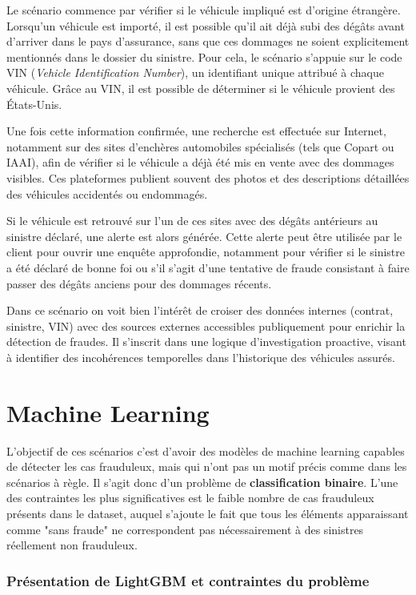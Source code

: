 \documentclass [twoside,openright,a4paper,11pt,french] {report}
\begin{document}
Le scénario commence par vérifier si le véhicule impliqué est d'origine étrangère. 
Lorsqu'un véhicule est importé, il est possible qu'il ait déjà subi des dégâts avant 
d'arriver dans le pays d'assurance, sans que ces dommages ne soient explicitement 
mentionnés dans le dossier du sinistre. Pour cela, le scénario s'appuie sur le code VIN 
(\textit{Vehicle Identification Number}), un identifiant unique attribué à chaque 
véhicule. Grâce au VIN, il est possible de déterminer si le véhicule provient des 
États-Unis.

Une fois cette information confirmée, une recherche est effectuée sur Internet, 
notamment sur des sites d'enchères automobiles spécialisés (tels que Copart ou IAAI), 
afin de vérifier si le véhicule a déjà été mis en vente avec des dommages visibles. 
Ces plateformes publient souvent des photos et des descriptions détaillées des véhicules 
accidentés ou endommagés.

Si le véhicule est retrouvé sur l'un de ces sites avec des dégâts antérieurs au sinistre 
déclaré, une alerte est alors générée. Cette alerte peut être utilisée par le client 
pour ouvrir une enquête approfondie, notamment pour vérifier si le sinistre a été 
déclaré de bonne foi ou s'il s'agit d'une tentative de fraude consistant à faire passer 
des dégâts anciens pour des dommages récents.

Dans ce scénario on voit bien l'intérêt de croiser des données internes (contrat, sinistre, 
VIN) avec des sources externes accessibles publiquement pour enrichir la détection de 
fraudes. Il s'inscrit dans une logique d'investigation proactive, visant à identifier 
des incohérences temporelles dans l'historique des véhicules assurés.

\section{Machine Learning}

L'objectif de ces scénarios c'est d'avoir des modèles de machine learning capables de détecter 
les cas frauduleux, mais qui n'ont pas un motif précis comme dans les scénarios à règle. Il s'agit donc 
d'un problème de \textbf{classification binaire}. L'une des contraintes les plus significatives 
est le faible nombre de cas frauduleux présents dans le dataset, auquel s'ajoute le fait que 
tous les éléments apparaissant comme "sans fraude" ne correspondent pas nécessairement à des sinistres 
réellement non frauduleux. 

\subsubsection{Présentation de LightGBM et contraintes du problème}
\end{document}
